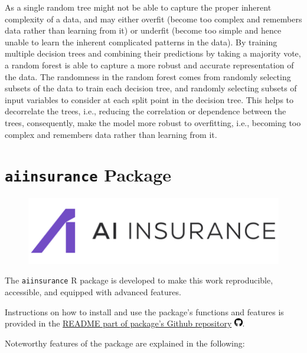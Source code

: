\documentclass{article}
\begin{document}
As a single random tree might not be able to capture the proper inherent
complexity of a data, and may either overfit (become too complex and
remembers data rather than learning from it) or underfit (become too
simple and hence unable to learn the inherent complicated patterns in
the data). By training multiple decision trees and combining their
predictions by taking a majority vote, a random forest is able to
capture a more robust and accurate representation of the data. The
randomness in the random forest comes from randomly selecting subsets of
the data to train each decision tree, and randomly selecting subsets of
input variables to consider at each split point in the decision tree.
This helps to decorrelate the trees, i.e., reducing the correlation or
dependence between the trees, consequently, make the model more robust
to overfitting, i.e., becoming too complex and remembers data rather
than learning from it.

\hypertarget{aiinsurance-package}{%
\section{\texorpdfstring{\texttt{aiinsurance} Package
\label{sec:package}}{aiinsurance Package }}\label{aiinsurance-package}}

\begin{figure}
\includegraphics[width=0.9\linewidth]{"./figures/logo.png"}
\end{figure}

The \texttt{aiinsurance} R package \cite{package} is developed to make
this work reproducible, accessible, and equipped with advanced features.

Instructions on how to install and use the package's functions and
features is provided in the
\href{https://github.com/berserkhmdvhb/aiinsurance\#readme}{README part
of package's Github repository}
\includegraphics[width=0.97em,height=1em]{report_files/figure-latex/fa-icon-9e25601f72c0b4fff1c079a486ca8bba.pdf}.

Noteworthy features of the package are explained in the following:
\end{document}
